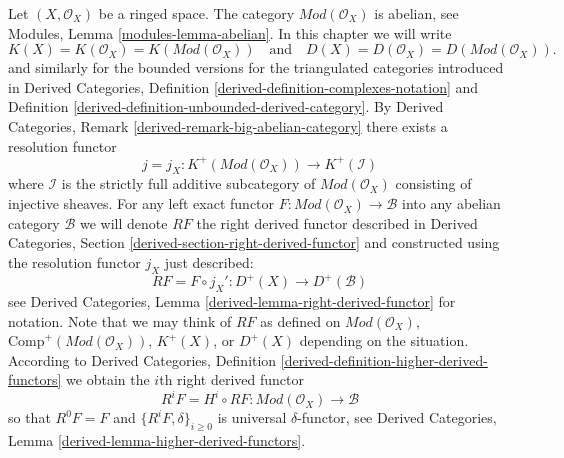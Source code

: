 \medskip\noindent
Let $(X, \mathcal{O}_X)$ be a ringed space. The category
$\textit{Mod}(\mathcal{O}_X)$ is abelian, see
Modules, Lemma \ref{modules-lemma-abelian}.
In this chapter we will write
$$
K(X) = K(\mathcal{O}_X) = K(\textit{Mod}(\mathcal{O}_X))
\quad
\text{and}
\quad
D(X) = D(\mathcal{O}_X) = D(\textit{Mod}(\mathcal{O}_X)).
$$
and similarly for the bounded versions for the triangulated categories
introduced in
Derived Categories, Definition \ref{derived-definition-complexes-notation} and
Definition \ref{derived-definition-unbounded-derived-category}.
By
Derived Categories, Remark \ref{derived-remark-big-abelian-category}
there exists a resolution functor
$$
j = j_X :
K^{+}(\textit{Mod}(\mathcal{O}_X))
\longrightarrow
K^{+}(\mathcal{I})
$$
where $\mathcal{I}$ is the strictly full additive subcategory of
$\textit{Mod}(\mathcal{O}_X)$ consisting of injective sheaves.
For any left exact functor
$F : \textit{Mod}(\mathcal{O}_X) \to \mathcal{B}$
into any abelian category $\mathcal{B}$ we will denote $RF$ the
right derived functor described in
Derived Categories, Section \ref{derived-section-right-derived-functor}
and constructed using the resolution functor $j_X$ just described:
\begin{equation}
\label{equation-RF}
RF = F \circ j_X' : D^{+}(X) \longrightarrow D^{+}(\mathcal{B})
\end{equation}
see
Derived Categories, Lemma \ref{derived-lemma-right-derived-functor}
for notation. Note that we may think of $RF$ as defined on
$\textit{Mod}(\mathcal{O}_X)$,
$\text{Comp}^{+}(\textit{Mod}(\mathcal{O}_X))$,
$K^{+}(X)$, or $D^{+}(X)$
depending on the situation. According to
Derived Categories, Definition \ref{derived-definition-higher-derived-functors}
we obtain the $i$th right derived functor
\begin{equation}
\label{equation-RFi}
R^iF = H^i \circ RF : \textit{Mod}(\mathcal{O}_X) \longrightarrow \mathcal{B}
\end{equation}
so that $R^0F = F$ and $\{R^iF, \delta\}_{i \geq 0}$ is universal
$\delta$-functor, see
Derived Categories, Lemma \ref{derived-lemma-higher-derived-functors}.

